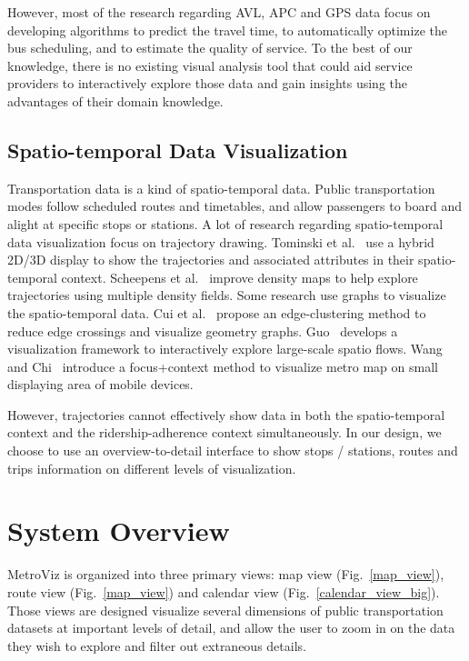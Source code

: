 \documentclass[journal]{vgtc}                %
\begin{document}
However, most of the research regarding AVL, APC and GPS data focus on developing algorithms to predict the travel time, to automatically optimize the bus scheduling, and to estimate the quality of service. To the best of our knowledge, there is no existing visual analysis tool that could aid service providers to interactively explore those data and gain insights using the advantages of their domain knowledge.

\subsection{Spatio-temporal Data Visualization}
Transportation data is a kind of spatio-temporal data. Public transportation modes follow scheduled routes and timetables, and allow passengers to board and alight at specific stops or stations. A lot of research regarding spatio-temporal data visualization focus on trajectory drawing. 
Tominski et al.~\cite{Tominski2012} use a hybrid 2D/3D display to show the trajectories and associated attributes in their spatio-temporal context.
Scheepens et al.~\cite{6065019} improve density maps to help explore trajectories using multiple density fields.
Some research use graphs to visualize the spatio-temporal data.
Cui et al.~\cite{4658140} propose an edge-clustering method to reduce edge crossings and visualize geometry graphs.
Guo~\cite{5290710} develops a visualization framework to interactively explore large-scale spatio flows.
Wang and Chi~\cite{6065020} introduce a focus+context method to visualize metro map on small displaying area of mobile devices.

However, trajectories cannot effectively show data in both the spatio-temporal context and the ridership-adherence context simultaneously. In our design, we choose to use an overview-to-detail interface to show stops / stations, routes and trips information on different levels of visualization.

\section{System Overview}
MetroViz is organized into three primary views: map view (Fig.~\ref{map_view}), route view (Fig.~\ref{map_view}) and calendar view (Fig.~\ref{calendar_view_big}). Those views are designed visualize several dimensions of public transportation datasets at important levels of detail, and allow the user to zoom in on the data they wish to explore and filter out extraneous details.
\end{document}
